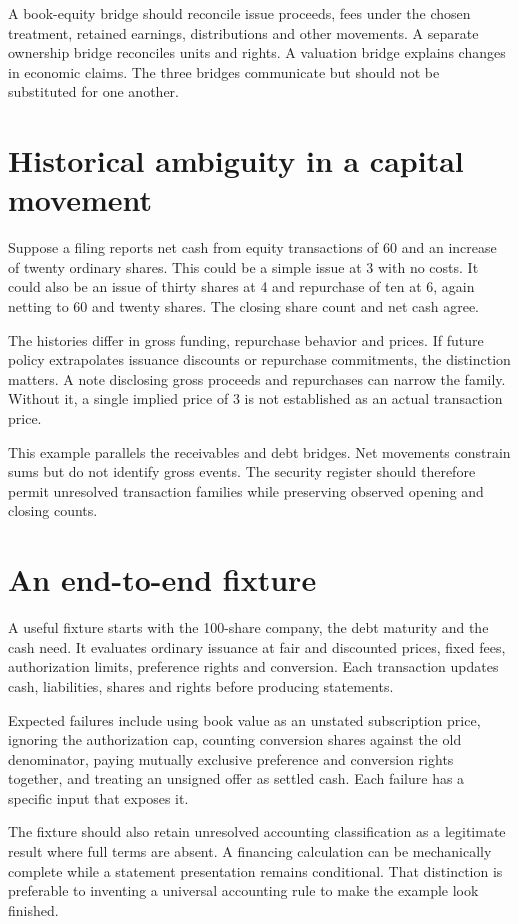 A book-equity bridge should reconcile issue proceeds, fees under the chosen treatment, retained earnings, distributions and other movements. A separate ownership bridge reconciles units and rights. A valuation bridge explains changes in economic claims. The three bridges communicate but should not be substituted for one another.

\section{Historical ambiguity in a capital movement}
Suppose a filing reports net cash from equity transactions of 60 and an increase of twenty ordinary shares. This could be a simple issue at 3 with no costs. It could also be an issue of thirty shares at 4 and repurchase of ten at 6, again netting to 60 and twenty shares. The closing share count and net cash agree.

The histories differ in gross funding, repurchase behavior and prices. If future policy extrapolates issuance discounts or repurchase commitments, the distinction matters. A note disclosing gross proceeds and repurchases can narrow the family. Without it, a single implied price of 3 is not established as an actual transaction price.

This example parallels the receivables and debt bridges. Net movements constrain sums but do not identify gross events. The security register should therefore permit unresolved transaction families while preserving observed opening and closing counts.

\section{An end-to-end fixture}
A useful fixture starts with the 100-share company, the debt maturity and the cash need. It evaluates ordinary issuance at fair and discounted prices, fixed fees, authorization limits, preference rights and conversion. Each transaction updates cash, liabilities, shares and rights before producing statements.

Expected failures include using book value as an unstated subscription price, ignoring the authorization cap, counting conversion shares against the old denominator, paying mutually exclusive preference and conversion rights together, and treating an unsigned offer as settled cash. Each failure has a specific input that exposes it.

The fixture should also retain unresolved accounting classification as a legitimate result where full terms are absent. A financing calculation can be mechanically complete while a statement presentation remains conditional. That distinction is preferable to inventing a universal accounting rule to make the example look finished.

